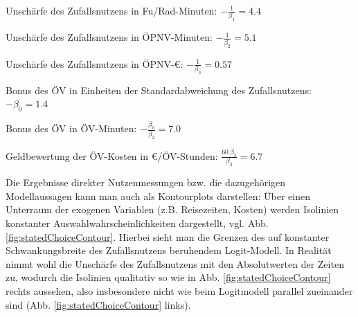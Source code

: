\bi
\item Unsch\"arfe des Zufallsnutzens in Fu\3/Rad-Minuten:
$
-\frac{1}{\beta_{1}}=4.4
$

\item Unsch\"arfe des Zufallsnutzens in \"OPNV-Minuten:
$
-\frac{1}{\beta_{2}}=5.1
$

\item Unsch\"arfe des Zufallsnutzens in \"OPNV-\euro{}:
$
-\frac{1}{\beta_{3}}=0.57
$

\item Bonus des \"OV in Einheiten der Standardabweichung des
  Zufallsnutzens: 
$
-\beta_{0}=1.4
$

\item Bonus des \"OV  in \"OV-Minuten:
$
-\frac{\beta_{0}}{\beta_{2}}=7.0
$


\item Geldbewertung der \"OV-Kosten in \euro{}/\"OV-Stunden:
   $
\frac{60 \ \beta_{2}}{\beta_{3}}=6.7
$
\ei



Die Ergebnisse direkter Nutzenmessungen bzw. die dazugeh\"origen
Modellaussagen kann man auch als Kontourplots
darstellen: \"Uber einen Unterraum der exogenen Variablen
(z.B. Reisezeiten, Kosten) werden 
Isolinien konstanter Auswahlwahrscheinlichkeiten dargestellt, vgl.
Abb. \ref{fig:statedChoiceContour}. Hierbei sieht man die Grenzen des
auf konstanter Schwan\-kungsbreite des Zufallsnutzens beruhendem
Logit-Modell. In Realit\"at nimmt wohl die Unsch\"arfe des
Zufallsnutzens mit den Absolutwerten der Zeiten zu, wodurch die
Isolinien qualitativ so wie in Abb. \ref{fig:statedChoiceContour}
rechts aussehen, also insbesondere nicht wie beim Logitmodell parallel
zueinander sind (Abb. \ref{fig:statedChoiceContour} links). 


